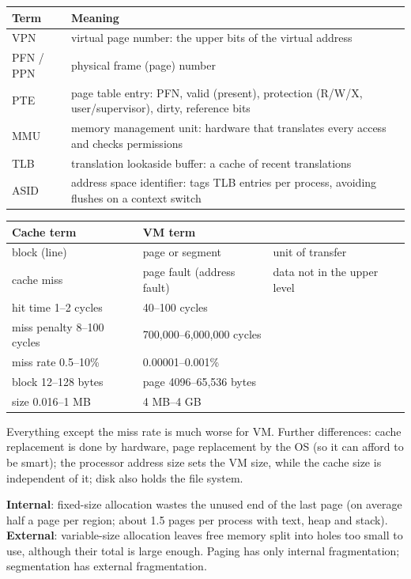 \begin{center}
\small
\begin{tabular}{@{}lP{10.6cm}@{}}
\toprule
Term & Meaning \\
\midrule
VPN & virtual page number: the upper bits of the virtual address \\
PFN / PPN & physical frame (page) number \\
PTE & page table entry: PFN, valid (present), protection (R/W/X, user/supervisor), dirty, reference bits \\
MMU & memory management unit: hardware that translates every access and checks permissions \\
TLB & translation lookaside buffer: a cache of recent translations \\
ASID & address space identifier: tags TLB entries per process, avoiding flushes on a context switch \\
\bottomrule
\end{tabular}
\end{center}

\begin{center}
\small
\begin{tabular}{@{}lll@{}}
\toprule
Cache term & VM term & \\
\midrule
block (line) & page or segment & unit of transfer \\
cache miss & page fault (address fault) & data not in the upper level \\
hit time 1--2 cycles & 40--100 cycles & \\
miss penalty 8--100 cycles & 700{,}000--6{,}000{,}000 cycles & \\
miss rate 0.5--10\% & 0.00001--0.001\% & \\
block 12--128 bytes & page 4096--65{,}536 bytes & \\
size 0.016--1 MB & 4 MB--4 GB & \\
\bottomrule
\end{tabular}
\end{center}
Everything except the miss rate is much worse for VM. Further differences:
cache replacement is done by hardware, page replacement by the OS (so it can
afford to be smart); the processor address size sets the VM size, while the cache
size is independent of it; disk also holds the file system.

\begin{definition}[Fragmentation]
\textbf{Internal}: fixed-size allocation wastes the unused end of the last page
(on average half a page per region; about 1.5 pages per process with text, heap
and stack). \textbf{External}: variable-size allocation leaves free memory split
into holes too small to use, although their total is large enough. Paging has
only internal fragmentation; segmentation has external
fragmentation.
\end{definition}


